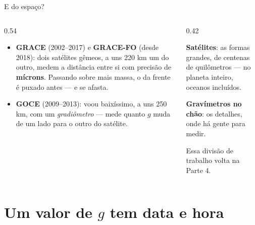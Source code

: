 \documentclass[aspectratio=169,11pt]{beamer}
\newcommand{\bnum}[1]{\textbf{\textcolor{mTeal}{#1}}}
\begin{document}
\begin{frame}{E do espaço?}
  \begin{columns}[T]
    \begin{column}{0.54\textwidth}
      \begin{itemize}
        \item \textbf{GRACE} (2002--2017) e \textbf{GRACE-FO} (desde 2018): dois satélites
              gêmeos, a uns 220 km um do outro, medem a distância entre si com precisão de
              \bnum{mícrons}. Passando sobre mais massa, o da frente é puxado antes --- e se
              afasta.
        \item \textbf{GOCE} (2009--2013): voou baixíssimo, a uns 250 km, com um
              \emph{gradiômetro} --- mede quanto $g$ muda de um lado para o outro do
              satélite.
      \end{itemize}
    \end{column}
    \begin{column}{0.42\textwidth}
      \begin{ideia}[title={Quem vê o quê}]
        \textbf{Satélites}: as formas grandes, de centenas de quilômetros --- no planeta
        inteiro, oceanos incluídos.
        \medskip

        \textbf{Gravímetros no chão}: os detalhes, onde há gente para medir.
      \end{ideia}
      \medskip
      {\small Essa divisão de trabalho volta na Parte 4.}
    \end{column}
  \end{columns}
\end{frame}

\section{Um valor de \texorpdfstring{$g$}{g} tem data e hora}
\end{document}
